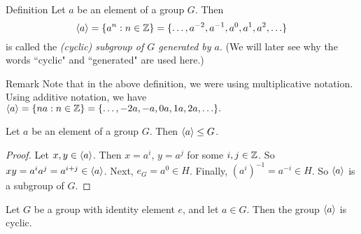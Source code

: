 \begin{df}{Definition} Let $a$ be an element of a group $G$.  Then
$$\langle a\rangle = \{a^n:n\in \mathbb{Z}\}=\{\ldots, a^{-2},a^{-1},a^0,a^1,a^2,\ldots\}$$is called the \textit{(cyclic) subgroup of $G$ generated by $a$}.
 (We will later see why the words ``cyclic" and
``generated" are used here.)\end{df}

\begin{df}{Remark} Note that in the above definition, we were using
multiplicative notation.  Using additive notation, we have
$\langle a\rangle=\{na:n\in \mathbb{Z}\}=\{\ldots, -2a, -a, 0a, 1a, 2a, \ldots\}.$ \end{df}


\begin{thm}\label{} Let $a$ be an element of a group $G$.  Then $\langle a\rangle\leq G$.
\end{thm}

\begin{proof} Let $x,y\in \langle a\rangle$.  Then $x=a^i$, $y=a^j$ for some $i,j\in \mathbb{Z}$.  So $xy=a^ia^j=a^{i+j}\in \langle a\rangle$.  Next, $e_G=a^0\in H$. Finally, $(a^i)^{-1}=a^{-i}\in H$. So $\langle a\rangle$ is a subgroup of $G$.\end{proof}




\begin{thm}\label{} Let $G$ be a group with identity element $e$, and let $a\in G$.  Then the group $\langle a\rangle$ is cyclic.\end{thm}

